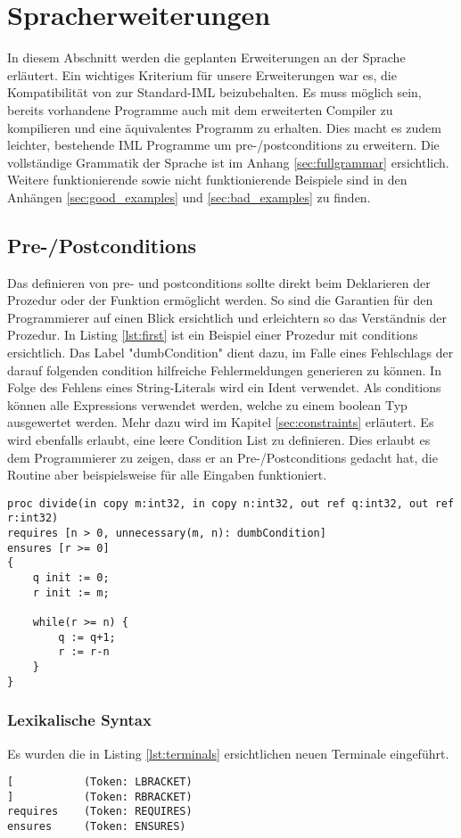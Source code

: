 \section{Spracherweiterungen}
In diesem Abschnitt werden die geplanten Erweiterungen an der Sprache erläutert. 
Ein wichtiges Kriterium für unsere Erweiterungen war es, die Kompatibilität von 
zur Standard-IML beizubehalten. Es muss möglich sein, bereits vorhandene Programme
auch mit dem erweiterten Compiler zu kompilieren und eine äquivalentes Programm zu 
erhalten. Dies macht es zudem leichter, bestehende IML Programme um pre-/postconditions
zu erweitern.
Die vollständige Grammatik der Sprache ist im Anhang \ref{sec:fullgrammar} 
ersichtlich. Weitere funktionierende sowie nicht funktionierende Beispiele sind in den Anhängen
\ref{sec:good_examples} und \ref{sec:bad_examples} zu finden.

\subsection{Pre-/Postconditions}
Das definieren von pre- und postconditions sollte direkt beim Deklarieren
der Prozedur oder der Funktion ermöglicht werden. So sind die Garantien
für den Programmierer auf einen Blick ersichtlich und erleichtern so 
das Verständnis der Prozedur. In Listing \ref{lst:first} ist ein Beispiel 
einer Prozedur mit conditions ersichtlich. Das Label "dumbCondition" dient dazu, im
Falle eines Fehlschlags der darauf folgenden condition hilfreiche Fehlermeldungen generieren zu können.
In Folge des Fehlens eines String-Literals wird ein Ident verwendet.
Als conditions können alle Expressions verwendet
werden, welche zu einem boolean Typ ausgewertet werden. Mehr dazu wird im 
Kapitel \ref{sec:constraints} erläutert.
Es wird ebenfalls erlaubt, eine leere Condition List zu definieren. Dies erlaubt es dem Programmierer
zu zeigen, dass er an Pre-/Postconditions gedacht hat, die Routine aber beispielsweise für alle
Eingaben funktioniert.
\newline
\begin{lstlisting}[caption=Beispiele von pre-/postconditions,label={lst:first}]
proc divide(in copy m:int32, in copy n:int32, out ref q:int32, out ref r:int32)
requires [n > 0, unnecessary(m, n): dumbCondition]
ensures [r >= 0]
{
    q init := 0;
    r init := m;

    while(r >= n) {
        q := q+1;
        r := r-n
    }
}
\end{lstlisting}

\subsubsection{Lexikalische Syntax}
Es wurden die in Listing \ref{lst:terminals} ersichtlichen neuen Terminale eingeführt.
\begin{lstlisting}[caption=Liste neuer Terminalsymbole,label=lst:terminals]
[           (Token: LBRACKET)
]           (Token: RBRACKET)
requires    (Token: REQUIRES)
ensures     (Token: ENSURES)
\end{lstlisting}

